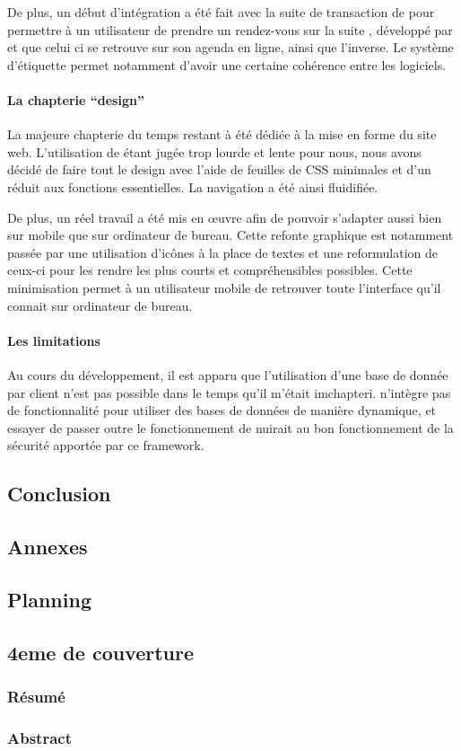 \documentclass[a4paper, 11pt]{report}
\begin{document}
    De plus, un début d'intégration a été fait avec la suite de transaction de \logilink pour permettre à un utilisateur de prendre un rendez-vous sur la suite \ulti, développé par \logilink et que celui ci se retrouve sur son agenda en ligne, ainsi que l'inverse. Le système d'étiquette permet notamment d'avoir une certaine cohérence entre les logiciels.

    \subsection{La chapterie ``design''}
    La majeure chapterie du temps restant à été dédiée à la mise en forme du site web. L'utilisation de \bootstrap étant jugée trop lourde et lente pour nous, nous avons décidé de faire tout le design avec l'aide de feuilles de CSS minimales et d'un \javascript réduit aux fonctions essentielles. La navigation a été ainsi fluidifiée.

    De plus, un réel travail a été mis en œuvre afin de pouvoir s'adapter aussi bien sur mobile que sur ordinateur de bureau. Cette refonte graphique est notamment passée par une utilisation d’icônes à la place de textes et une reformulation de ceux-ci pour les rendre les plus courts et compréhensibles possibles. Cette minimisation permet à un utilisateur mobile de retrouver toute l'interface qu'il connait sur ordinateur de bureau.

    \subsection{Les limitations}
    Au cours du développement, il est apparu que l'utilisation d'une base de donnée par client n'est pas possible dans le temps qu'il m'était imchapteri. \symfony n'intègre pas de fonctionnalité pour utiliser des bases de données de manière dynamique, et essayer de passer outre le fonctionnement de \symfony nuirait au bon fonctionnement de la sécurité apportée par ce framework.

\chapter{Conclusion}

\begin{appendix}
    \part{Annexes}
        \chapter{Planning}
\end{appendix}

\chapter{4eme de couverture}
    \section{Résumé}
    \section{Abstract}
\end{document}
